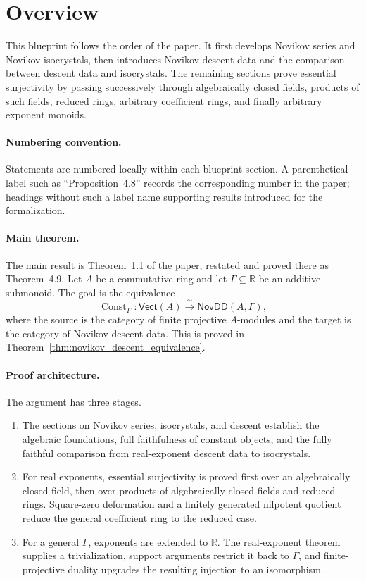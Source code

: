 \section*{Overview}
\label{sec:overview}
\addoverviewtotoc

This blueprint follows the order of the paper.  It first develops Novikov
series and Novikov isocrystals, then introduces Novikov descent data and the
comparison between descent data and isocrystals.  The remaining sections prove
essential surjectivity by passing successively through algebraically closed
fields, products of such fields, reduced rings, arbitrary coefficient rings,
and finally arbitrary exponent monoids.

\paragraph{Numbering convention.}
Statements are numbered locally within each blueprint section.  A
parenthetical label such as ``Proposition~4.8'' records the corresponding
number in the paper; headings without such a label name supporting results
introduced for the formalization.

\paragraph{Main theorem.}
The main result is Theorem~1.1 of the paper, restated and proved there as
Theorem~4.9.  Let $A$ be a commutative ring and let
$\Gamma\subseteq\mathbb{R}$ be an additive submonoid.  The goal is the equivalence
\[
  \operatorname{Const}_\Gamma\colon
  \mathsf{Vect}(A)\xrightarrow{\ \sim\ }\mathsf{NovDD}(A,\Gamma),
\]
where the source is the category of finite projective $A$-modules and the
target is the category of Novikov descent data.  This is proved in
Theorem~\ref{thm:novikov_descent_equivalence}.

\paragraph{Proof architecture.}
The argument has three stages.
\begin{enumerate}
  \item The sections on Novikov series, isocrystals, and descent establish the
    algebraic foundations, full faithfulness of constant objects, and the
    fully faithful comparison from real-exponent descent data to isocrystals.
  \item For real exponents, essential surjectivity is proved first over an
    algebraically closed field, then over products of algebraically closed
    fields and reduced rings.  Square-zero deformation and a finitely
    generated nilpotent quotient reduce the general coefficient ring to the
    reduced case.
  \item For a general $\Gamma$, exponents are extended to $\mathbb{R}$.  The
    real-exponent theorem supplies a trivialization, support arguments restrict
    it back to $\Gamma$, and finite-projective duality upgrades the resulting
    injection to an isomorphism.
\end{enumerate}

